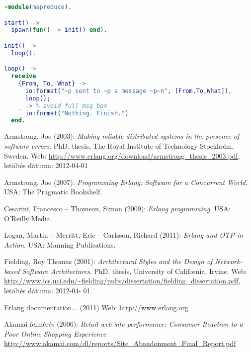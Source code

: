\documentclass[12pt, a4paper, oneside]{book}
\begin{document}
{\footnotesize

\begin{lstlisting}[emph={fun}, emphstyle=\textbf, caption=Map reduce module, language=erlang, frame=single]
-module(mapreduce).

start() ->
  spawn(fun() -> init() end).

init() ->
  loop().

loop() ->
  receive
    {From, To, What} ->
      io:format("~p sent to ~p a message ~p~n", [From,To,What]),
      loop();
    _ -> % avoid full msg box
      io:format("Nothing. Finish.")
  end.

\end{lstlisting}
}

\begin{thebibliography}{9}

Armstrong, Joe (2003): \emph{Making reliable distributed systems in the presence of software errors}. PhD.
thesis, The Royal Institute of Technology Stockholm, Sweden. Web:
\url{http://www.erlang.org/download/armstrong_thesis_2003.pdf}, letöltés dátuma: 2012-04-01

Armstrong, Joe (2007): \emph{Programming Erlang: Software for a Concurrent World}. USA: The Pragmatic
Bookshelf.

Cesarini, Francesco – Thomson, Simon (2009): \emph{Erlang programming}. USA: O'Reilly Media.

Logan, Martin – Merritt, Eric – Carlsson, Richard (2011): \emph{Erlang and OTP in Action}. USA:
Manning Publications.

Fielding, Roy Thomas (2001): \emph{Architectural Styles and the Design of Network-based Software
Architectures}. PhD. thesis, University of California, Irvine. Web:
\url{http://www.ics.uci.edu/~fielding/pubs/dissertation/fielding_dissertation.pdf}, letöltés dátuma: 2012-04-
01.

Erlang documentation... (2011) Web: \url{http://www.erlang.org}

Akamai felmérés (2006): \emph{Retail web site performance: Consumer Reaction to a Poor Online
Shopping Experience}
\url{http://www.akamai.com/dl/reports/Site_Abandonment_Final_Report.pdf}

\end{thebibliography}

\clearpage
{}
\printindex
\end{document}
